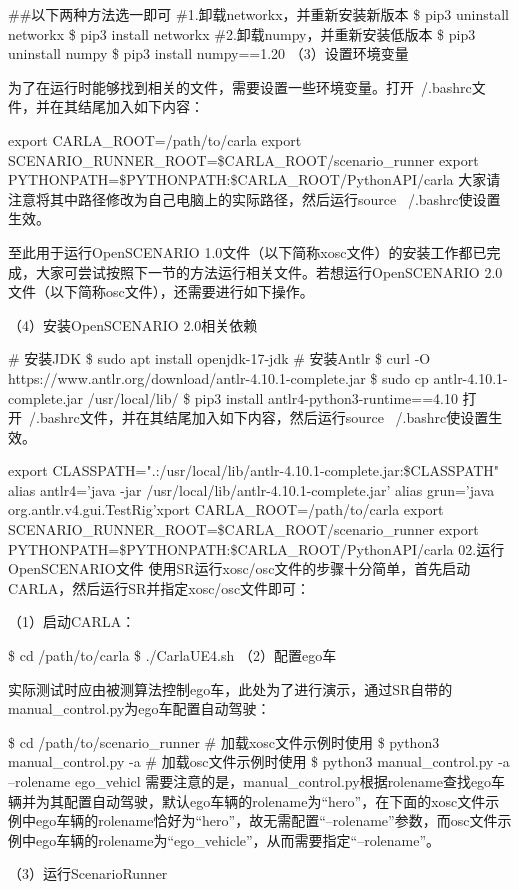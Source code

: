 \#\#以下两种方法选一即可
\#1.卸载networkx，并重新安装新版本
\$ pip3 uninstall networkx
\$ pip3 install networkx
\#2.卸载numpy，并重新安装低版本
\$ pip3 uninstall numpy
\$ pip3 install numpy==1.20
（3）设置环境变量

为了在运行时能够找到相关的文件，需要设置一些环境变量。打开~/.bashrc文件，并在其结尾加入如下内容：

export CARLA\_ROOT=/path/to/carla
export SCENARIO\_RUNNER\_ROOT=\$CARLA\_ROOT/scenario\_runner
export PYTHONPATH=\$PYTHONPATH:\$CARLA\_ROOT/PythonAPI/carla
大家请注意将其中路径修改为自己电脑上的实际路径，然后运行source ~/.bashrc使设置生效。

至此用于运行OpenSCENARIO 1.0文件（以下简称xosc文件）的安装工作都已完成，大家可尝试按照下一节的方法运行相关文件。若想运行OpenSCENARIO 2.0文件（以下简称osc文件），还需要进行如下操作。

（4）安装OpenSCENARIO 2.0相关依赖

\# 安装JDK
\$ sudo apt install openjdk-17-jdk
\# 安装Antlr
\$ curl -O https://www.antlr.org/download/antlr-4.10.1-complete.jar
\$ sudo cp antlr-4.10.1-complete.jar /usr/local/lib/
\$ pip3 install antlr4-python3-runtime==4.10
打开~/.bashrc文件，并在其结尾加入如下内容，然后运行source ~/.bashrc使设置生效。

export CLASSPATH=".:/usr/local/lib/antlr-4.10.1-complete.jar:\$CLASSPATH"
alias antlr4='java -jar /usr/local/lib/antlr-4.10.1-complete.jar'
alias grun='java org.antlr.v4.gui.TestRig'xport CARLA\_ROOT=/path/to/carla
export SCENARIO\_RUNNER\_ROOT=\$CARLA\_ROOT/scenario\_runner
export PYTHONPATH=\$PYTHONPATH:\$CARLA\_ROOT/PythonAPI/carla
02.运行OpenSCENARIO文件
使用SR运行xosc/osc文件的步骤十分简单，首先启动CARLA，然后运行SR并指定xosc/osc文件即可：

（1）启动CARLA：

\$ cd /path/to/carla
\$ ./CarlaUE4.sh
（2）配置ego车

实际测试时应由被测算法控制ego车，此处为了进行演示，通过SR自带的manual\_control.py为ego车配置自动驾驶：

\$ cd /path/to/scenario\_runner
\# 加载xosc文件示例时使用
\$ python3 manual\_control.py  -a
\# 加载osc文件示例时使用
\$ python3 manual\_control.py  -a --rolename ego\_vehicl
需要注意的是，manual\_control.py根据rolename查找ego车辆并为其配置自动驾驶，默认ego车辆的rolename为“hero”，在下面的xosc文件示例中ego车辆的rolename恰好为“hero”，故无需配置“--rolename”参数，而osc文件示例中ego车辆的rolename为“ego\_vehicle”，从而需要指定“--rolename”。

（3）运行ScenarioRunner


